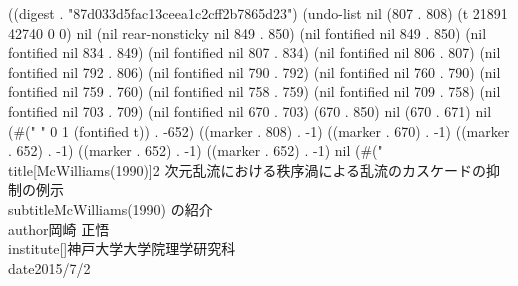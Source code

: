
((digest . "87d033d5fac13ceea1c2cff2b7865d23") (undo-list nil (807 . 808) (t 21891 42740 0 0) nil (nil rear-nonsticky nil 849 . 850) (nil fontified nil 849 . 850) (nil fontified nil 834 . 849) (nil fontified nil 807 . 834) (nil fontified nil 806 . 807) (nil fontified nil 792 . 806) (nil fontified nil 790 . 792) (nil fontified nil 760 . 790) (nil fontified nil 759 . 760) (nil fontified nil 758 . 759) (nil fontified nil 709 . 758) (nil fontified nil 703 . 709) (nil fontified nil 670 . 703) (670 . 850) nil (670 . 671) nil (#("
" 0 1 (fontified t)) . -652) ((marker . 808) . -1) ((marker . 670) . -1) ((marker . 652) . -1) ((marker . 652) . -1) ((marker . 652) . -1) nil (#("%
\\title[McWilliams(1990)]{2 次元乱流における秩序渦による乱流のカスケードの抑制の例示}
\\subtitle{McWilliams(1990) の紹介}
\\author{岡崎 正悟}
\\institute[]{神戸大学大学院理学研究科}
\\date{2015/7/2}

